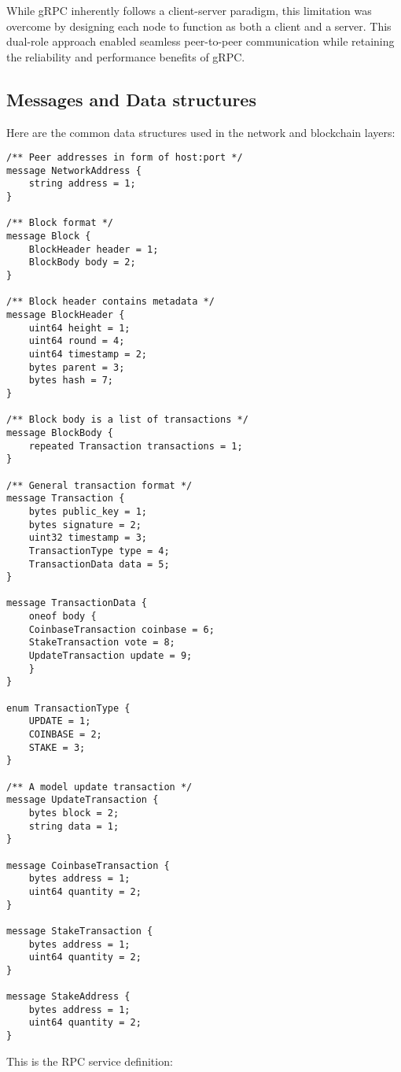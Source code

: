 While gRPC inherently follows a client-server paradigm, this limitation was overcome by designing each node
to function as both a client and a server. This dual-role approach enabled seamless peer-to-peer
communication while retaining the reliability and performance benefits of gRPC.

\subsection{Messages and Data structures}\label{sec:messages}
Here are the common data structures used in the network and blockchain layers:
\begin{verbatim}
/** Peer addresses in form of host:port */
message NetworkAddress {
    string address = 1;
}

/** Block format */
message Block {
    BlockHeader header = 1;
    BlockBody body = 2;
}

/** Block header contains metadata */
message BlockHeader {
    uint64 height = 1;
    uint64 round = 4;
    uint64 timestamp = 2;
    bytes parent = 3;
    bytes hash = 7;
}

/** Block body is a list of transactions */
message BlockBody {
    repeated Transaction transactions = 1;
}

/** General transaction format */
message Transaction {
    bytes public_key = 1;
    bytes signature = 2;
    uint32 timestamp = 3;
    TransactionType type = 4;
    TransactionData data = 5;
}

message TransactionData {
    oneof body {
    CoinbaseTransaction coinbase = 6;
    StakeTransaction vote = 8;
    UpdateTransaction update = 9;
    }
}

enum TransactionType {
    UPDATE = 1;
    COINBASE = 2;
    STAKE = 3;
}

/** A model update transaction */
message UpdateTransaction {
    bytes block = 2;
    string data = 1;
}

message CoinbaseTransaction {
    bytes address = 1;
    uint64 quantity = 2;
}

message StakeTransaction {
    bytes address = 1;
    uint64 quantity = 2;
}

message StakeAddress {
    bytes address = 1;
    uint64 quantity = 2;
}
\end{verbatim}

This is the RPC service definition:

